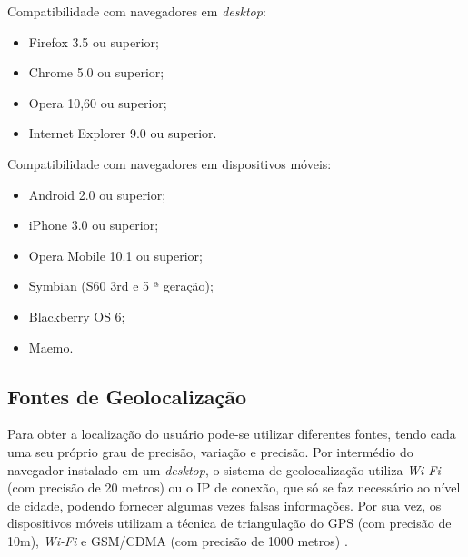 Compatibilidade com navegadores em \textit{desktop}:
\begin{itemize}
    \item Firefox 3.5 ou superior;
    \item Chrome 5.0 ou superior;
    \item Opera 10,60 ou superior;
    \item Internet Explorer 9.0 ou superior. \\
\end{itemize}

Compatibilidade com navegadores em dispositivos móveis:
\begin{itemize}
    \item Android 2.0 ou superior;
    \item iPhone 3.0 ou superior;
    \item Opera Mobile 10.1 ou superior;
    \item Symbian (S60 3rd e 5 ª geração);
    \item Blackberry OS 6;
    \item Maemo.
\end{itemize}

\subsection{Fontes de Geolocalização}

Para obter a localização do usuário pode-se utilizar diferentes fontes, tendo cada uma seu próprio grau de precisão, variação e precisão. Por intermédio do navegador instalado em um \textit{desktop}, o sistema de geolocalização utiliza \textit{Wi-Fi} (com precisão de 20 metros) ou o IP de conexão, que só se faz necessário ao nível de cidade, podendo fornecer algumas vezes falsas informações. Por sua vez, os dispositivos móveis utilizam a técnica de triangulação do GPS (com precisão de 10m), \textit{Wi-Fi} e GSM/CDMA (com precisão de 1000 metros) \cite{geolocalizacao:2011}.


